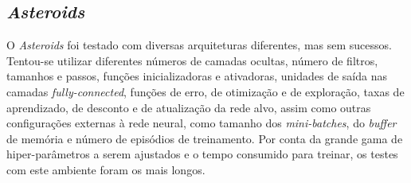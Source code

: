 

\subsection{\textit{Asteroids}}
\label{sec:arq_asteroids}

O \textit{Asteroids} foi testado com diversas arquiteturas diferentes, mas sem sucessos.
Tentou-se utilizar diferentes números de camadas ocultas, número de filtros, tamanhos e passos, funções inicializadoras e ativadoras, unidades de saída nas camadas \textit{fully-connected}, funções de erro, de otimização e de exploração, taxas de aprendizado, de desconto e de atualização da rede alvo, assim como outras configurações externas à rede neural, como tamanho dos \textit{mini-batches}, do \textit{buffer} de memória e número de episódios de treinamento.
Por conta da grande gama de hiper-parâmetros a serem ajustados e o tempo consumido para treinar, os testes com este ambiente foram os mais longos.

